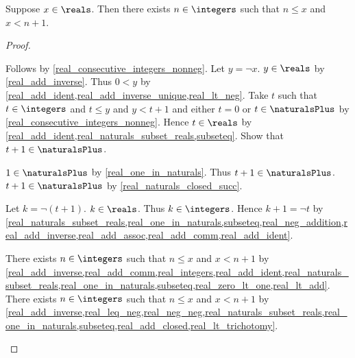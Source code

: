 \begin{proposition}\label{real_consecutive_integers}
    Suppose $x\in\reals$.
    Then there exists $n\in\integers$ such that $n \leq x$ and $x < n + 1$.
\end{proposition}
\begin{proof}
    \begin{byCase}
        Follows by \cref{real_consecutive_integers_nonneg}.
        Let $y = \neg{x}$.
        $y\in\reals$ by \cref{real_add_inverse}.
        Thus $0 < y$ by \cref{real_add_ident,real_add_inverse_unique,real_lt_neg}.
        Take $t$ such that $t\in\integers$ and $t \leq y$ and $y < t + 1$ and either $t = 0$ or $t\in\naturalsPlus$ by \cref{real_consecutive_integers_nonneg}.
        Hence $t\in\reals$ by \cref{real_add_ident,real_naturals_subset_reals,subseteq}.
        Show that $t + 1\in\naturalsPlus$.
        \begin{subproof}
            \begin{byCase}
                $1\in\naturalsPlus$ by \cref{real_one_in_naturals}.
                Thus $t + 1\in\naturalsPlus$.
                $t + 1\in\naturalsPlus$ by \cref{real_naturals_closed_succ}.
            \end{byCase}
        \end{subproof}
        Let $k = \neg{(t + 1)}$.
        $k\in\reals$.
        Thus $k\in\integers$. %
        Hence $k + 1 = \neg{t}$ by \cref{real_naturals_subset_reals,real_one_in_naturals,subseteq,real_neg_addition,real_add_inverse,real_add_assoc,real_add_comm,real_add_ident}.
        \begin{byCase}
            There exists $n\in\integers$ such that $n \leq x$ and $x < n + 1$ by \cref{real_add_inverse,real_add_comm,real_integers,real_add_ident,real_naturals_subset_reals,real_one_in_naturals,subseteq,real_zero_lt_one,real_lt_add}.
            There exists $n\in\integers$ such that $n \leq x$ and $x < n + 1$ by \cref{real_add_inverse,real_leq_neg,real_neg_neg,real_naturals_subset_reals,real_one_in_naturals,subseteq,real_add_closed,real_lt_trichotomy}.
        \end{byCase}
    \end{byCase}
\end{proof}
  
